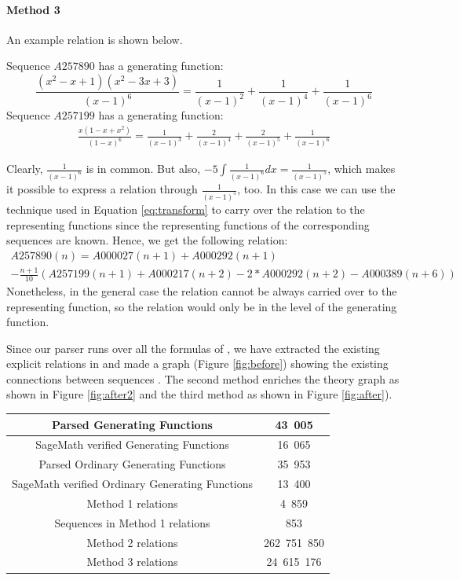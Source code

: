 \paragraph{Method 3} An example relation is shown below.

Sequence $A257890$ has a generating function:
\begin{equation}
\frac{(x^2-x+1)(x^2-3x+3)}{(x-1)^6} = \frac{1}{(x - 1)^2} + \frac{1}{(x - 1)^4} + \frac{1}{(x - 1)^6}
\end{equation}
Sequence $A257199$ has a generating function:
\begin{align}
\frac{x(1 - x + x^2)}{(1 - x)^6} = \frac{1}{(x - 1)^3} + \frac{2}{(x - 1)^4} + \frac{2}{(x - 1)^5} + \frac{1}{(x - 1)
^6}
\end{align}

Clearly, $\frac{1}{(x-1)^6}$ is in common. But also, $-5\int \frac{1}{(x-1)^6} dx = \frac{1}{(x-1)^5}$, which makes
it possible to express a relation through $\frac{1}{(x-1)^5}$, too. In this case we can use the technique used in
Equation \ref{eq:transform} to carry over the relation to the representing functions since the representing functions
 of the corresponding sequences are known. Hence, we get the following relation:
\begin{multline}
A257890(n) = A000027(n+1) + A000292(n+1) \\
- \frac{n+1}{10}(A257199(n+1)
 + A000217(n+2) - 2*A000292(n+2) - A000389(n+6))
\end{multline}
Nonetheless, in the general case the relation cannot be always carried over to the representing function, so the
relation would only be in the level of the generating function.

Since our parser runs over all the formulas of \oeis, we have extracted the existing explicit relations in \oeis and
made a graph (Figure \ref{fig:before}) showing the existing connections between sequences .
The second method enriches the theory graph as shown in Figure \ref{fig:after2} and the third method as shown in
Figure \ref{fig:after}).

\begin{center}
 \begin{tabular}{||c | c||}
 \hline
 Parsed Generating Functions & 43\ 005 \\
 \hline
 SageMath verified Generating Functions & 16\ 065 \\
 \hline
 Parsed Ordinary Generating Functions &  35\ 953 \\
 \hline
 SageMath verified Ordinary Generating Functions & 13\ 400 \\
 \hline
 Method 1 relations & 4\ 859 \\
 \hline
 Sequences in Method 1 relations & 853 \\
 \hline
 Method 2 relations & 262\ 751\ 850\\
 \hline
 Method 3 relations & 24\ 615\ 176 \\
 \hline
\end{tabular}
\end{center}

